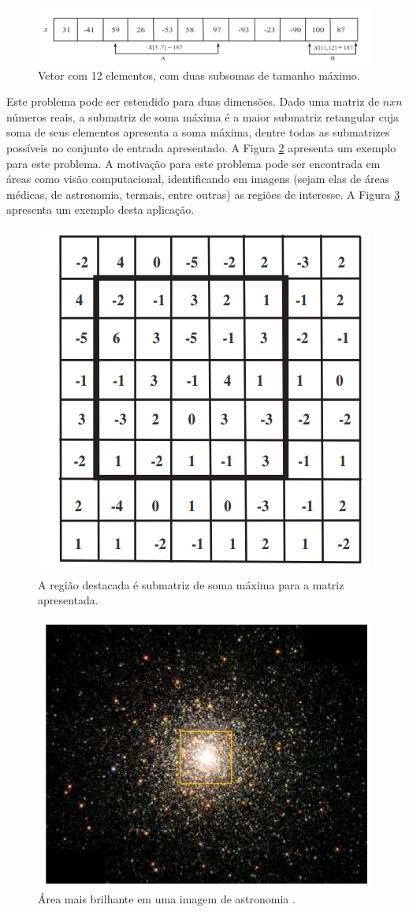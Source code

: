 \documentclass[a4paper, 12pt] {article}
\begin{document}
\begin{figure}[ht]
\centering
\includegraphics[width=\textwidth]{maxsubsum.png}
\caption{Vetor com 12 elementos, com duas subsomas de tamanho máximo.}
\label{fig:maxsubsum}
\end{figure}

Este problema pode ser estendido para duas dimensões. Dado uma matriz de $nxn$
números reais, a submatriz de soma máxima é a maior submatriz retangular cuja
soma de seus elementos apresenta a soma máxima, dentre todas as submatrizes
possíveis no conjunto de entrada apresentado. A Figura \ref{fig:maxsubarray}
apresenta um exemplo para este problema. A motivação para este problema pode ser
encontrada em áreas como visão computacional, identificando em imagens (sejam
elas de áreas médicas, de astronomia, termais, entre outras) as regiões de
interesse. A Figura \ref{fig:brightest} apresenta um exemplo desta aplicação.

\begin{figure}[ht]
\centering
\includegraphics[width=.4\textwidth]{maxsubarray.png}
\caption{A região destacada é submatriz de soma máxima para a matriz
apresentada.}
\label{fig:maxsubarray}
\end{figure}

\begin{figure}[ht]
\centering
\includegraphics[width=.6\textwidth]{brightest.png}
\caption{Área mais brilhante em uma imagem de astronomia \cite{bae2007}.}
\label{fig:brightest}
\end{figure}
\end{document}
